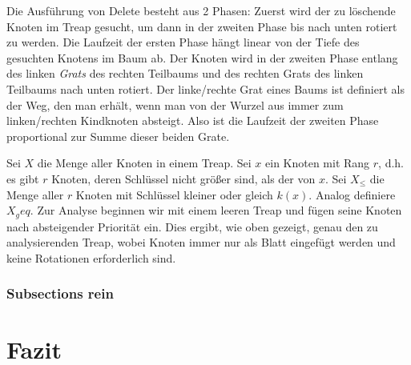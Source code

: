 \documentclass[a4paper]{scrreprt}
\theoremstyle{definition}
\begin{document}
Die Ausführung von Delete besteht aus 2 Phasen:
Zuerst wird der zu löschende Knoten im Treap gesucht, um dann in der zweiten Phase bis nach unten rotiert zu werden.
Die Laufzeit der ersten Phase hängt linear von der Tiefe des gesuchten Knotens im Baum ab.
Der Knoten wird in der zweiten Phase entlang des linken \emph{Grats} des rechten Teilbaums und des rechten Grats des linken Teilbaums nach unten rotiert.
Der linke/rechte Grat eines Baums ist definiert als der Weg, den man erhält, wenn man von der Wurzel aus immer zum linken/rechten Kindknoten absteigt.
Also ist die Laufzeit der zweiten Phase proportional zur Summe dieser beiden Grate.

Sei $X$ die Menge aller Knoten in einem Treap.
Sei $x$ ein Knoten mit Rang $r$, d.h. es gibt $r$ Knoten, deren Schlüssel nicht größer sind, als der von $x$.
Sei $X_\leq$ die Menge aller $r$ Knoten mit Schlüssel kleiner oder gleich $k(x)$.
Analog definiere $X_geq$.
Zur Analyse beginnen wir mit einem leeren Treap und fügen seine Knoten nach absteigender Priorität ein.
Dies ergibt, wie oben gezeigt, genau den zu analysierenden Treap, wobei Knoten immer nur als Blatt eingefügt werden und keine Rotationen erforderlich sind.



\subsection{Subsections rein} %
\label{sec:section3}

\chapter{Fazit}
\label{sec:closing}



\end{document}
